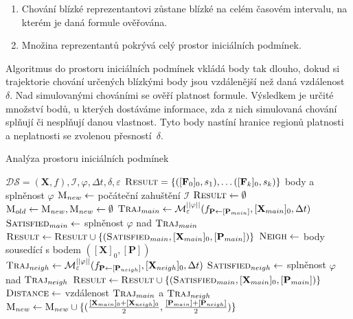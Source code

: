 \begin{enumerate}
	\item	Chování blízké reprezentantovi zůstane blízké na celém časovém intervalu,
			na kterém je daná formule ověřována.
	\item	Množina reprezentantů pokrývá celý prostor iniciálních podmínek.
\end{enumerate}

Algoritmus do prostoru iniciálních podmínek vkládá body tak dlouho, dokud si trajektorie chování
určených blízkými body jsou vzdálenější než daná vzdálenost $\delta$. Nad simulovanými chováními
se ověří platnost formule. Výsledkem je určité množství bodů, u kterých dostáváme informace,
zda z nich simulovaná chování splňují či nesplňují danou vlastnost. Tyto body nastíní
hranice regionů platnosti a neplatnosti se zvolenou přes\-nos\-tí~$\delta$.

\begin{algorithm}
\caption{Analýza prostoru iniciálních podmínek}
\label{algorithm:main:original}
\begin{algorithmic}[1]
\Require 	$\mathcal{DS} = (\mathbf{X}, f), \mathcal{I}, \varphi, \Delta t, \delta, \varepsilon$
\Ensure 	$\textsc{Result} = \{([\mathbf{F}_0]_0, s_1), \ldots ([\mathbf{F}_k]_0, s_k)\}$ \Comment body a splněnost $\varphi$
\State		$\textsc{M}_{new} 	\gets $ počáteční zahuštění $\mathcal{I}$
\State		$\textsc{Result} \gets \emptyset$
	\State $\textsc{M}_{old} \gets \textsc{M}_{new}, \textsc{M}_{new} \gets \emptyset$
		\State $\textsc{Traj}_{main} \gets \mathcal{M}^{||\varphi||}_\varepsilon(f_{\mathbf{P} \gets [\mathbf{P}_{main}]}, [\mathbf{X}_{main}]_0, \Delta t)$
		\State $\textsc{Satisfied}_{main} \gets $ splněnost $\varphi$ nad $\textsc{Traj}_{main}$
		\State $\textsc{Result} \gets \textsc{Result} \cup \{(\textsc{Satisfied}_{main}, [\mathbf{X}_{main}]_0, [\mathbf{P}_{main}])\}$
		\State $\textsc{Neigh} \gets $ body sousedící s bodem $([\mathbf{X}]_0, [\mathbf{P}])$
			\State $\textsc{Traj}_{neigh} \gets \mathcal{M}^{||\varphi||}_\varepsilon(f_{\mathbf{P} \gets [\mathbf{P}_{neigh}]}, [\mathbf{X}_{neigh}]_0, \Delta t)$
			\State $\textsc{Satisfied}_{neigh} \gets $ splněnost $\varphi$ nad $\textsc{Traj}_{neigh}$
			\State $\textsc{Result} \gets \textsc{Result} \cup \{(\textsc{Satisfied}_{main}, [\mathbf{X}_{main}]_0, [\mathbf{P}_{main}])\}$
			\State $\textsc{Distance} \gets $ vzdálenost $\textsc{Traj}_{main}$ a $\textsc{Traj}_{neigh}$\label{algorithm:line:trajectory:distance}
			\label{algorithm:line:trajectory:delta}
				\State	$\textsc{M}_{new} \gets \textsc{M}_{new} \cup \{(\frac{[\mathbf{X}_{main}]_0 + [\mathbf{X}_{neigh}]_0}{2}, \frac{[\mathbf{P}_{main}] + [\mathbf{P}_{neigh}]}{2})\}$
			\EndIf
		\EndFor
	\EndFor
\EndWhile
\end{algorithmic}
\end{algorithm}

